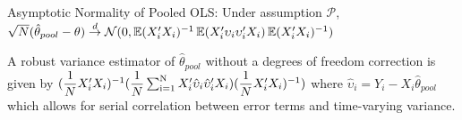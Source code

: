 \begin{theorem}
Asymptotic Normality of Pooled OLS: Under assumption $\mathcal{P}$, \\ 
$ \sqrt{N}(\hat\theta_{pool} - \theta) \overset{d}{\to} \mathcal{N}(0,\operatorname{\mathbb{E}}(X_i'X_i)^{-1}\operatorname{\mathbb{E}}(X_i'\upsilon_i \upsilon_i' X_i)\operatorname{\mathbb{E}}(X_i' X_i)^{-1})$ %
\end{theorem}
A robust variance estimator of $\hat\theta_{pool}$ without a degrees of freedom correction is given by 
$(\dfrac{1}{N} X_i' X_i)^{-1}(\dfrac{1}{N}\operatorname*{\sum_{i=1}^N} X_i'\hat \upsilon_i \hat \upsilon_i' X_i) (\dfrac{1}{N} X_i' X_i)^{-1})$ where $\hat{\upsilon}_i = Y_i - X_i\hat\theta_{pool}$ which allows for serial correlation between error terms and time-varying variance. 
